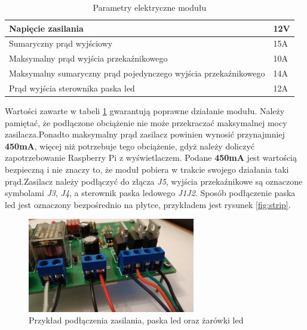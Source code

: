 \documentclass[12pt, eng, twoside, openany, final]{mgr}
\begin{document}
        \begin{table}[H]
        \centering
        \begin{tabular}{ | m{18em} | m{1cm}| } 
        \hline
        Napięcie zasilania & 12V \\ 
        \hline
        Sumaryczny prąd wyjściowy & 15A \\ 
        \hline
        Maksymalny prąd wyjścia przekaźnikowego &10A\\
        \hline
        Maksymalny sumaryczny prąd pojedynczego wyjścia przekaźnikowego &14A\\
        \hline
        Prąd wyjścia sterownika paska led &12A\\
        \hline
        \end{tabular}
        \caption{Parametry elektryczne modułu}
        \label{tab:param}
        \end{table}
    \noindent
    Wartości zawarte w tabeli \ref{tab:param} gwarantują poprawne działanie modułu. 
    Należy pamiętać, że podłączone obciążenie nie może przekraczać maksymalnej mocy zasilacza.Ponadto maksymalny prąd zasilacz powinien wynosić przynajmniej \textbf{450mA}, więcej niż potrzebuje tego obciążenie, gdyż należy doliczyć zapotrzebowanie Raspberry Pi z wyświetlaczem. Podane \textbf{450mA} jest wartością bezpieczną i nie znaczy to, że moduł pobiera w trakcie swojego działania taki prąd.\newpage \noindent Zasilacz należy podłączyć do złącza \emph{J5}, wyjścia przekaźnikowe są oznaczone symbolami \emph{J3}, \emph{J4}, a sterownik paska ledowego \emph{J1J2}. Sposób podłączenie paska led jest oznaczony bezpośrednio na płytce, przykładem jest rysunek \ref{fig:strip}. 
        \begin{figure}[H]
        \begin{center}
            \includegraphics[width=0.65\textwidth]{podlaczone.jpg}
            \caption{Przykład podłączenia zasilania, paska led oraz żarówki led}
        \end{center}
        \end{figure}
\end{document}
